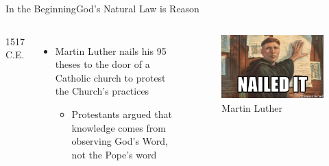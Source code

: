 \begin{frame}{In the Beginning}{God's Natural Law is Reason}
	\begin{columns}[c]
			1517 C.E.
			\begin{itemize}
				\item Martin Luther nails his 95 theses to the door of a Catholic church to protest the Church's practices
					\begin{itemize}
						\item Protestants argued that knowledge comes from observing God's Word, not the Pope's word
					\end{itemize}
			\end{itemize}
			\begin{figure}
				\centering
				\includegraphics[width=\textwidth]{images/martin_luther}
				\caption{Martin Luther}
			\end{figure}
	\end{columns}
\end{frame}

